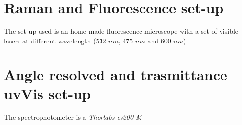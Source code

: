 \label{Chapter1} %





\section{Raman and Fluorescence set-up}

The set-up used is an home-made fluorescence microscope with a set of visible lasers at different wavelength ($532$ $nm$, $475$ $nm$ and $600$ $nm$)


\section{Angle resolved and trasmittance uvVis set-up}

The spectrophotometer is a \emph{Thorlabs cs200-M}